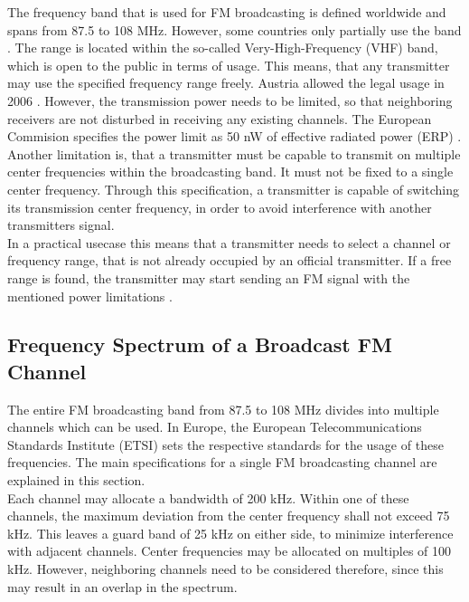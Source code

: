 The frequency band that is used for FM broadcasting is defined worldwide and spans from 87.5 to 108 MHz.
However, some countries only partially use the band \cite[RR5-39]{ItuRadioRegulations}.
The range is located within the so-called Very-High-Frequency (VHF) band, which is open to the public in terms of usage.
This means, that any transmitter may use the specified frequency range freely.
Austria allowed the legal usage in 2006 \cite{AustriaRundfunkgesetz2014}.
However, the transmission power needs to be limited, so that neighboring receivers are not disturbed in receiving any existing channels.
The European Commision specifies the power limit as 50 nW of effective radiated power (ERP) \cite{EuCommissionRadioSpectrumHarmonization}.
Another limitation is, that a transmitter must be capable to transmit on multiple center frequencies within the broadcasting band.
It must not be fixed to a single center frequency.
Through this specification, a transmitter is capable of switching its transmission center frequency, in order to avoid interference with another transmitters signal.\\

In a practical usecase this means that a transmitter needs to select a channel or frequency range, that is not already occupied by an official transmitter.
If a free range is found, the transmitter may start sending an FM signal with the mentioned power limitations \cite{EbuFmRegulators}.



\subsection{Frequency Spectrum of a Broadcast FM Channel}
\label{sec:FrequencySpectrumOfABroadcastFmChannel}

The entire FM broadcasting band from 87.5 to 108 MHz divides into multiple channels which can be used.
In Europe, the European Telecommunications Standards Institute (ETSI) sets the respective standards for the usage of these frequencies.
The main specifications for a single FM broadcasting channel are explained in this section.\\

Each channel may allocate a bandwidth of 200 kHz.
Within one of these channels, the maximum deviation from the center frequency shall not exceed 75 kHz.
This leaves a guard band of 25 kHz on either side, to minimize interference with adjacent channels.
Center frequencies may be allocated on multiples of 100 kHz.
However, neighboring channels need to be considered therefore, since this may result in an overlap in the spectrum.\\

